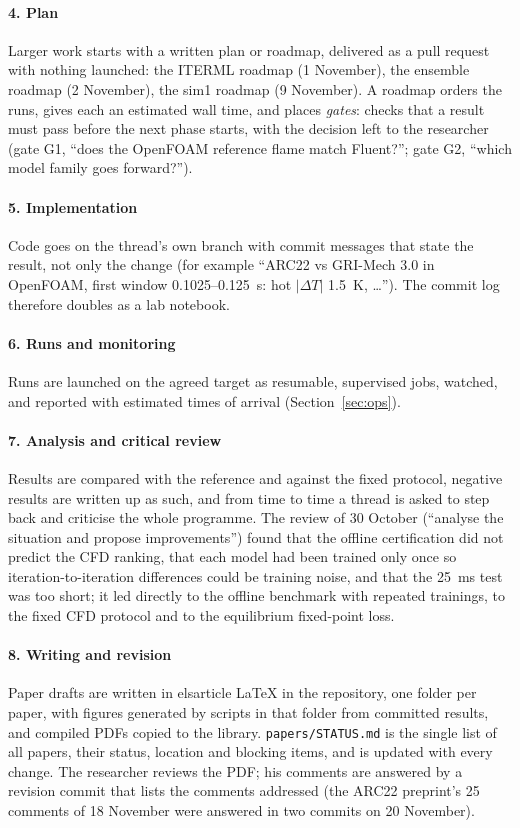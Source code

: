 \documentclass[preprint,review,12pt]{elsarticle}
\begin{document}
\paragraph{4. Plan} Larger work starts with a written plan or roadmap, delivered as a pull request with nothing
launched: the ITERML roadmap (1 November), the ensemble roadmap (2 November), the sim1 roadmap (9 November). A roadmap
orders the runs, gives each an estimated wall time, and places \emph{gates}: checks that a result must pass before the
next phase starts, with the decision left to the researcher (gate G1, ``does the OpenFOAM reference flame match
Fluent?''; gate G2, ``which model family goes forward?'').

\paragraph{5. Implementation} Code goes on the thread's own branch with commit messages that state the result, not
only the change (for example ``ARC22 vs GRI-Mech 3.0 in OpenFOAM, first window 0.1025--0.125~s: hot $|\Delta T|$
1.5~K, \ldots''). The commit log therefore doubles as a lab notebook.

\paragraph{6. Runs and monitoring} Runs are launched on the agreed target as resumable, supervised jobs, watched, and
reported with estimated times of arrival (Section~\ref{sec:ops}).

\paragraph{7. Analysis and critical review} Results are compared with the reference and against the fixed protocol,
negative results are written up as such, and from time to time a thread is asked to step back and criticise the whole
programme. The review of 30 October (``analyse the situation and propose improvements'') found that the offline
certification did not predict the CFD ranking, that each model had been trained only once so iteration-to-iteration
differences could be training noise, and that the 25~ms test was too short; it led directly to the offline benchmark
with repeated trainings, to the fixed CFD protocol and to the equilibrium fixed-point loss.

\paragraph{8. Writing and revision} Paper drafts are written in elsarticle \LaTeX{} in the repository, one folder per
paper, with figures generated by scripts in that folder from committed results, and compiled PDFs copied to the
library. \texttt{papers/STATUS.md} is the single list of all papers, their status, location and blocking items, and is
updated with every change. The researcher reviews the PDF; his comments are answered by a revision commit that lists
the comments addressed (the ARC22 preprint's 25 comments of 18 November were answered in two commits on 20 November).
\end{document}
